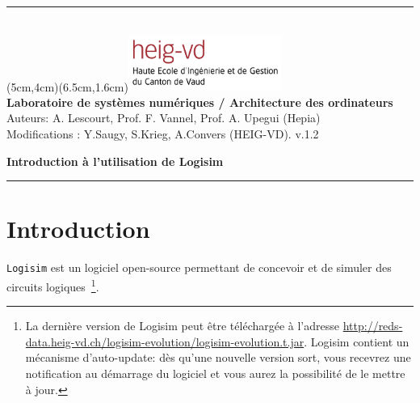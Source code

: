 \documentclass[nosolution]{exercice}
\begin{document}
\noindent
\begin{minipage}[l]{\linewidth}
  \rule{\linewidth}{0.2mm} \\

  {\vspace{-5mm}
    \parpic(5cm,4cm)(6.5cm,1.6cm){\includegraphics[width=5cm]{images/HEIG-VD_logo_couleur_format_JPG.jpg}}
    \vspace{15mm} \\
    \textbf{Laboratoire de systèmes numériques / Architecture des ordinateurs} \\
    Auteurs: A. Lescourt, Prof. F. Vannel, Prof. A. Upegui (Hepia)\\
    Modifications : Y.Saugy, S.Krieg, A.Convers (HEIG-VD). v.1.2
    }

    \vspace{7mm}

  \begin{center}
    {\Large\textbf{Introduction à l'utilisation de Logisim} \\
      \vspace{5mm}}
  \end{center}

  \rule{\linewidth}{0.2mm}
\end{minipage}


\setlength{\parskip}{5pt}
\setlength{\parsep}{5pt}
\setlength{\topsep}{5pt}
\setlength{\itemsep}{5pt}

\renewcommand{\labelitemi}{$\bullet$}
\renewcommand{\labelitemii}{$-$}
\renewcommand{\labelitemiii}{$\diamond$}
\renewcommand{\labelitemiv}{$\ast$}


\section{Introduction}
\texttt{Logisim} est un logiciel open-source permettant de concevoir et de simuler des circuits
logiques~\footnote{La dernière version de Logisim peut être téléchargée à l'adresse
  \url{http://reds-data.heig-vd.ch/logisim-evolution/logisim-evolution.t.jar}.
  Logisim contient un mécanisme d'auto-update: dès qu'une nouvelle version sort, vous recevrez
  une notification au démarrage du logiciel et vous aurez
  la possibilité de le mettre à jour.}.
\end{document}
